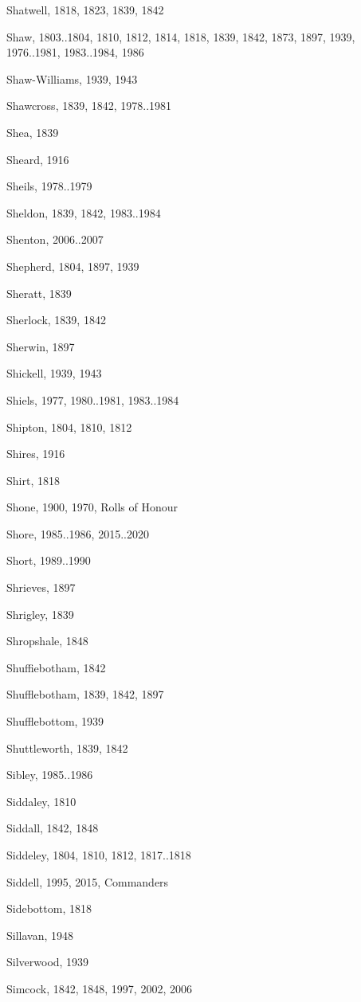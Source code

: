 {\begin{theindex}
\item Shatwell, 1818, 1823, 1839, 1842
\item Shaw, 1803..1804, 1810, 1812, 1814, 1818, 1839, 1842, 1873, 1897, 1939, 1976..1981, 1983..1984, 1986
\item Shaw-Williams, 1939, 1943
\item Shawcross, 1839, 1842, 1978..1981
\item Shea, 1839
\item Sheard, 1916
\item Sheils, 1978..1979
\item Sheldon, 1839, 1842, 1983..1984
\item Shenton, 2006..2007
\item Shepherd, 1804, 1897, 1939
\item Sheratt, 1839
\item Sherlock, 1839, 1842
\item Sherwin, 1897
\item Shickell, 1939, 1943
\item Shiels, 1977, 1980..1981, 1983..1984
\item Shipton, 1804, 1810, 1812
\item Shires, 1916
\item Shirt, 1818
\item Shone, 1900, 1970, Rolls of Honour
\item Shore, 1985..1986, 2015..2020
\item Short, 1989..1990
\item Shrieves, 1897
\item Shrigley, 1839
\item Shropshale, 1848
\item Shuffiebotham, 1842
\item Shufflebotham, 1839, 1842, 1897
\item Shufflebottom, 1939
\item Shuttleworth, 1839, 1842
\item Sibley, 1985..1986
\item Siddaley, 1810
\item Siddall, 1842, 1848
\item Siddeley, 1804, 1810, 1812, 1817..1818
\item Siddell, 1995, 2015, Commanders
\item Sidebottom, 1818
\item Sillavan, 1948
\item Silverwood, 1939
\item Simcock, 1842, 1848, 1997, 2002, 2006

\end{theindex}}
